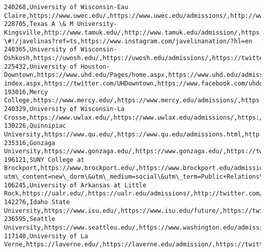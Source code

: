 \documentclass[11pt]{article}
\begin{document}
\begin{Verbatim}[commandchars=\\\{\}]
240268,University of Wisconsin-Eau Claire,https://www.uwec.edu/,https://www.uwec.edu/admissions/,http://www.twitter.com/uweauclaire,http://www.facebook.com/uweauclaire/,http://www.instagram.com/uweauclaire/
228705,Texas A \& M University-Kingsville,http://www.tamuk.edu/,http://www.tamuk.edu/admission/,https://twitter.com/JavelinaNation,http://www.facebook.com/home.php?\#!/javelinas?ref=ts,https://www.instagram.com/javelinanation/?hl=en
240365,University of Wisconsin-Oshkosh,https://uwosh.edu/,https://uwosh.edu/admissions/,https://twitter.com/uwoshkosh,https://www.facebook.com/uwoshkosh,http://instagram.com/uwoshkosh
225432,University of Houston-Downtown,https://www.uhd.edu/Pages/home.aspx,https://www.uhd.edu/admissions/Pages/admissions-index.aspx,https://twitter.com/UHDowntown,https://www.facebook.com/uhdowntown/,https://www.instagram.com/uhdofficial/
193016,Mercy College,https://www.mercy.edu/,https://www.mercy.edu/admissions/,https://twitter.com/mercycollege,https://www.facebook.com/mercycollegeny,https://www.instagram.com/mercycollege/
240329,University of Wisconsin-La Crosse,https://www.uwlax.edu/,https://www.uwlax.edu/admissions/,https://twitter.com/uwlacrosse,https://www.facebook.com/UWLaCrosse,https://instagram.com/uwlax/
130226,Quinnipiac University,https://www.qu.edu/,https://www.qu.edu/admissions.html,http://twitter.com/quinnipiacu,https://www.facebook.com/QuinnipiacUniversity/,https://instagram.com/quinnipiacu
235316,Gonzaga University,https://www.gonzaga.edu/,https://www.gonzaga.edu/,https://twitter.com/Gonzaga\_Prez,https://www.facebook.com/GonzagaUniversity/,https://www.instagram.com/p/BpVJVwUn3ic/
196121,SUNY College at Brockport,https://www.brockport.edu/,https://www.brockport.edu/admissions/,//www.twitter.com/brockport,https://brockport.edu/about/newsbureau/2258.html?utm\_content=new\_dorm\&utm\_medium=social\&utm\_term=Public+Relations\&utm\_source=facebook\&utm\_campaign=College+at+Brockport,//www.instagram.com/brockport
106245,University of Arkansas at Little Rock,https://ualr.edu/,https://ualr.edu/admissions/,http://twitter.com/ualr,https://www.facebook.com/UALittleRock/,http://instagram.com/ualr
142276,Idaho State University,https://www.isu.edu/,https://www.isu.edu/future/,https://twitter.com/IdahoStateU,https://www.facebook.com/idahostateu,https://instagram.com/idahostateu/
236595,Seattle University,https://www.seattleu.edu/,https://www.washington.edu/admissions/,https://twitter.com/seattleu,https://www.facebook.com/seattleu,http://instagram.com/seattleu
117140,University of La Verne,https://laverne.edu/,https://laverne.edu/admission/,https://twitter.com/ULaVerne/,https://www.facebook.com/ULaVerne/,https://www.instagram.com/p/BonOlCKAYXe/

\end{Verbatim}
\end{document}
